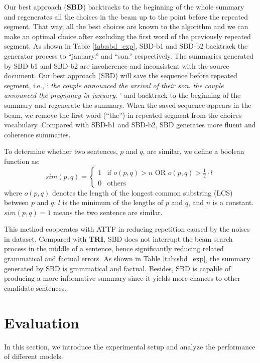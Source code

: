 \documentclass{nle}
\theoremstyle{definition}
\newcommand{\tabref}[1]{Table \ref{#1}}
\begin{document}
Our best approach (\textbf{SBD}) backtracks to the beginning of the whole summary
and regenerates all the choices in the beam up to the point before
the repeated segment. That way, all the best choices are known to the
algorithm and we can make an optimal choice after excluding the first word
of the previously repeated segment. 
As shown in \tabref{tab:sbd_exp},
SBD-b1 and SBD-b2 backtrack the generator process
to ``january.'' and ``son.'' respectively.
The summaries generated by SBD-b1 and SBD-b2 
are incoherence and inconsistent with the source document.
Our best approach (SBD) will save the sequence before repeated segment, i.e., 
`\textit{
	the couple announced the arrival of their son.
	the couple announced the pregnancy in january.}
'
and backtrack to the beginning of the summary and regenerate the summary. 
When the saved sequence appears in the beam, we remove the first word (``the'') in 
repeated segment from the choices vocabulary. 
Compared with SBD-b1 and SBD-b2, SBD generates more fluent and coherence summaries.


To determine whether two sentences, 
$p$ and $q$, are similar, we define a boolean function as:
\begin{equation}\label{eq:s}
	sim(p,q) = 
	\begin{cases}
		1 &\mbox{if $o(p,q) > n\text{ OR }o(p,q) > \frac{1}{2}\cdot l$}\\
		0 &\mbox{others}
	\end{cases}
\end{equation}
where $o(p,q)$ denotes the length of 
the longest common substring (LCS) between $p$ and $q$, 
$l$ is the minimum of the lengths of $p$ and $q$, and $n$ is a constant. 
$sim(p,q)=1$ means the two sentence are similar.

This method cooperates with ATTF in 
reducing repetition caused by the noises in dataset.
Compared with \textbf{TRI},  SBD does not interrupt the beam search process in the middle of a sentence, hence significantly reducing related grammatical and factual errors. 
As shown in \tabref{tab:sbd_exp}, 
the summary generated by SBD is grammatical and factual. 
Besides, SBD is capable of producing a more informative summary since it yields more chances to other candidate sentences.

\section{Evaluation}
\label{sec:eval}
In this section, we introduce the experimental setup
and analyze the performance of different models.
\end{document}
